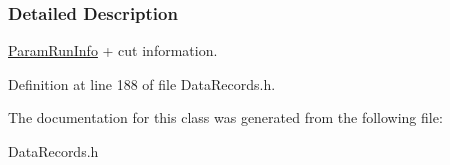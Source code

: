 \subsubsection{Detailed Description}
\hyperlink{classParamRunInfo}{ParamRunInfo} + cut information. 

Definition at line 188 of file DataRecords.h.



The documentation for this class was generated from the following file:\begin{DoxyCompactItemize}
\item 
DataRecords.h\end{DoxyCompactItemize}
